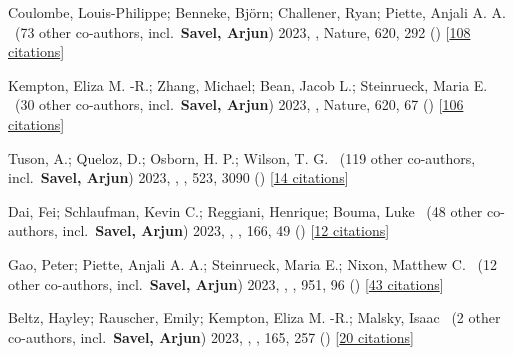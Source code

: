 \item[{\color{numcolor}\scriptsize27}] Coulombe, Louis-Philippe; Benneke, Bj{\"o}rn; Challener, Ryan; Piette, Anjali A. A. \etal\ ({73} other co-authors, incl.\ \textbf{Savel, Arjun}) 2023, , Nature, {620}, 292 () [\href{https://ui.adsabs.harvard.edu/abs/2023Natur.620..292C}{108 citations}]

\item[{\color{numcolor}\scriptsize26}] Kempton, Eliza M. -R.; Zhang, Michael; Bean, Jacob L.; Steinrueck, Maria E. \etal\ ({30} other co-authors, incl.\ \textbf{Savel, Arjun}) 2023, , Nature, {620}, 67 () [\href{https://ui.adsabs.harvard.edu/abs/2023Natur.620...67K}{106 citations}]

\item[{\color{numcolor}\scriptsize25}] Tuson, A.; Queloz, D.; Osborn, H. P.; Wilson, T. G. \etal\ ({119} other co-authors, incl.\ \textbf{Savel, Arjun}) 2023, , \mnras, {523}, 3090 () [\href{https://ui.adsabs.harvard.edu/abs/2023MNRAS.523.3090T}{14 citations}]

\item[{\color{numcolor}\scriptsize24}] Dai, Fei; Schlaufman, Kevin C.; Reggiani, Henrique; Bouma, Luke \etal\ ({48} other co-authors, incl.\ \textbf{Savel, Arjun}) 2023, , \aj, {166}, 49 () [\href{https://ui.adsabs.harvard.edu/abs/2023AJ....166...49D}{12 citations}]

\item[{\color{numcolor}\scriptsize23}] Gao, Peter; Piette, Anjali A. A.; Steinrueck, Maria E.; Nixon, Matthew C. \etal\ ({12} other co-authors, incl.\ \textbf{Savel, Arjun}) 2023, , \apj, {951}, 96 () [\href{https://ui.adsabs.harvard.edu/abs/2023ApJ...951...96G}{43 citations}]

\item[{\color{numcolor}\scriptsize22}] Beltz, Hayley; Rauscher, Emily; Kempton, Eliza M. -R.; Malsky, Isaac \etal\ ({2} other co-authors, incl.\ \textbf{Savel, Arjun}) 2023, , \aj, {165}, 257 () [\href{https://ui.adsabs.harvard.edu/abs/2023AJ....165..257B}{20 citations}]

